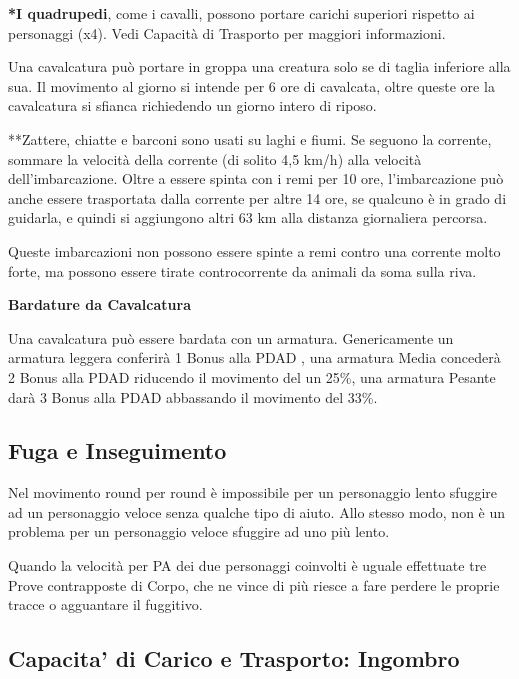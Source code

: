 \documentclass[12pt,a4paper,twoside,openany]{book}
\begin{document}
\begin{multicols}{2}

\bigskip

\textbf{*I quadrupedi}, come i cavalli, possono portare carichi superiori rispetto ai personaggi (x4). Vedi Capacità di Trasporto per maggiori informazioni.

Una cavalcatura può portare in groppa una creatura solo se di taglia inferiore alla sua. Il movimento al giorno si intende per 6 ore di cavalcata, oltre queste ore la cavalcatura si sfianca richiedendo un giorno intero di riposo.

**Zattere, chiatte e barconi sono usati su laghi e fiumi. Se seguono la corrente, sommare la velocità della corrente (di solito 4,5 km/h) alla velocità dell'imbarcazione. Oltre a essere spinta con i remi per 10 ore, l'imbarcazione può anche essere trasportata dalla corrente per altre 14 ore, se qualcuno è in grado di guidarla, e quindi si aggiungono altri 63 km alla distanza giornaliera percorsa.

Queste imbarcazioni non possono essere spinte a remi contro una corrente molto forte, ma possono essere tirate controcorrente da animali da soma sulla riva.

\textbf{Bardature da Cavalcatura}

Una cavalcatura può essere bardata con un armatura. Genericamente un armatura leggera conferirà 1 Bonus alla PDAD , una armatura Media concederà 2 Bonus alla PDAD riducendo il movimento del un 25\%, una armatura Pesante darà 3 Bonus alla PDAD abbassando il movimento del 33\%.

\subsection{Fuga e Inseguimento}\label{fugainseguimento}

Nel movimento round per round è impossibile per un personaggio lento sfuggire ad un personaggio veloce senza qualche tipo di aiuto. Allo stesso modo, non è un problema per un personaggio veloce sfuggire ad uno più lento.

Quando la velocità per PA dei due personaggi coinvolti è uguale effettuate tre Prove contrapposte di Corpo, che ne vince di più riesce a fare perdere le proprie tracce o agguantare il fuggitivo.

\subsection{Capacita' di Carico e Trasporto: Ingombro}


\end{multicols}
\end{document}
